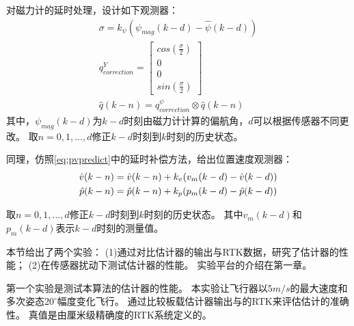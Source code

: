 \documentclass[
  type=master
]{gdutthesis}
\begin{document}
对磁力计的延时处理，设计如下观测器：\vspace{1ex}
\begin{gather}\label{eq:myyawcorrection}
		\sigma = k_{\psi} (\psi_{mag}(k-d) - \hat{\psi}(k-d)) \\
		q_{correction}^{Y} = \begin{bmatrix}
			cos(\frac{\sigma}{2}) \\
			0 \\
			0 \\
			sin(\frac{\sigma}{2})
		\end{bmatrix}\\
		\hat{q}(k-n) = q_{correction}^{\psi} \otimes \hat{q}(k-n)
\end{gather}
其中，$\psi_{mag}(k-d)$为$k-d$时刻由磁力计计算的偏航角，$d$可以根据传感器不同更改。
取$n=0,1,...,d$修正$k-d$时刻到$k$时刻的历史状态。

同理，仿照\autoref{eq:pvpredict}中的延时补偿方法，给出位置速度观测器：\vspace{1ex}
\begin{gather}\label{eq:mypvcorrection}
		\hat{v}(k-n) = \hat{v}(k-n) + k_v (v_m(k-d) - \hat{v}(k-d))\\
		\hat{p}(k-n) = \hat{p}(k-n) + k_p (p_m(k-d) - \hat{p}(k-d))\vspace{1ex}
\end{gather}
取$n=0,1,...,d$修正$k-d$时刻到$k$时刻的历史状态。
其中$v_m(k-d)$和$p_m(k-d)$表示$k-d$时刻的测量值。

本节给出了两个实验：
(1)通过对比估计器的输出与RTK数据，研究了估计器的性能；
(2)在传感器扰动下测试估计器的性能。
实验平台的介绍在第一章。

第一个实验是测试本算法的估计器的性能。
本实验让飞行器以$5m/s$的最大速度和多次姿态$20^{\circ}$幅度变化飞行。
通过比较板载估计器输出与的RTK来评估估计的准确性。
真值是由厘米级精确度的RTK系统定义的。
\end{document}
